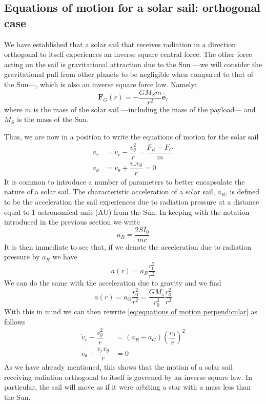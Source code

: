 \documentclass[twocolumn,12pt,a4paper]{article}
\numberwithin{equation}{section}
\begin{document}
\subsection{Equations of motion for a solar sail: orthogonal case}
We have established that a solar sail that receives radiation in a direction orthogonal to itself experiences an inverse square central force. The other force acting on the sail is gravitational attraction due to the Sun ---we will consider the gravitational pull from other planets to be negligible when compared to that of the Sun---, which is also an inverse square force law. Namely:
\begin{equation}
 	\mathbf{F}_G(r) = -\dfrac{G M_S m}{r^2} \mathbf{\hat{e}}_r \label{eq:gravitational force}
\end{equation}
where \( m \) is the mass of the solar sail ---including the mass of the payload--- and \( M_S \) is the mass of the Sun.

Thus, we are now in a position to write the equations of motion for the solar sail
\begin{align}
	a_{r} &= \dot{v}_r - \dfrac{v_{\theta}^2}{r} = \dfrac{F_R - F_G}{m} \label{eq:equations of motion perpendicular} \\
	a_{\theta} &= \dot{v}_{\theta} + \dfrac{v_r v_{\theta}}{r} = 0 
\end{align}
It is common to introduce a number of parameters to better encapsulate the nature of a solar sail. The characteristic acceleration of a solar sail, \( a_R \), is defined to be the acceleration the sail experiences due to radiation pressure at a distance equal to 1 astronomical unit (AU) from the Sun. In keeping with the notation introduced in the previous section we write
\begin{equation} \label{eq:characterisit acceleration}
  a_R = \dfrac{2SI_0}{mc}
\end{equation}
It is then immediate to see that, if we denote the acceleration due to radiation pressure by \( a_R \) we have
\begin{equation}
  a(r) = a_R \dfrac{r_0^2}{r^2} 
\end{equation}
We can do the same with the acceleration due to gravity and we find
\begin{equation}
  a(r) = a_G \dfrac{r_0^2}{r^2} = \dfrac{G M_s}{r_0^2} \dfrac{r_0^2}{r^2}
\end{equation}
With this in mind we can then rewrite \autoref{eq:equations of motion perpendicular} as follows
\begin{align} \label{eq:equations of motion characteristic accelerations}
  \dot{v}_r - \dfrac{v_{\theta}^2}{r} &= (a_R - a_G) \left(\dfrac{r_0}{r}\right)^2 \\
	\dot{v}_{\theta} + \dfrac{v_r v_{\theta}}{r} &= 0
\end{align}
As we have already mentioned, this shows that the motion of a solar sail receiving radiation orthogonal to itself is governed by an inverse square law. In particular, the sail will move as if it were orbiting a star with a mass less than the Sun.
\end{document}
